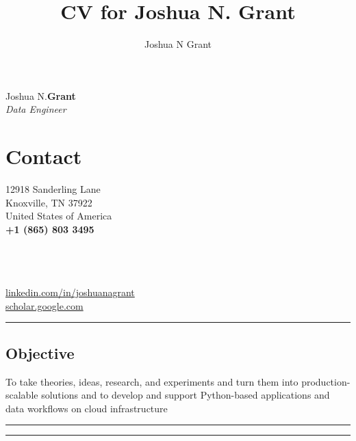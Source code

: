 \documentclass[10pt]{article}%
\author{Joshua N Grant}
\title{CV for Joshua N. Grant}
\begin{document}
\begin{minipage}[ht]{.33\linewidth}%
  \setlength{\headsep}{-10pt}%
  \setlength{\voffset}{-0.75in}%
  {\Large Joshua N.\huge\textbf{Grant}} \\
   \large \textit{Data Engineer}
\end{minipage}
\begin{minipage}[ht]{.25\linewidth}%
  \section*{\faUser{} Contact}%
  12918 Sanderling Lane \\
  Knoxville, TN 37922 \\
  United States of America \\
  \textbf{+1 (865) 803 3495} \faMobile{} \\
\end{minipage}
\begin{minipage}[ht]{.5\linewidth}%
  \href{mailto:jngrant@live.com}{\color{linkcolor}{jngrant@live.com \faEnvelope}} \\
  \href{https://notjustadatum.blogspot.com}{\color{linkcolor}{notjustadatum.blogspot.com \faBold}} \\
  \href{https://github.com/sempervent}{\color{linkcolor}{github.com/sempervent \faGithubAlt}} \\
  \href{https://www.linkedin.com/in/joshuanagrant}{\color{linkcolor} {\small linkedin.com/in/joshuanagrant} \faLinkedin} \\
  \href{https://scholar.google.com/citations?user=vs-HJQcAAAAJ&hl=en}{\color{linkcolor} {scholar.google.com \faPencil}}
\end{minipage}
\par\noindent\rule{\textwidth}{0.4pt}
\begin{center}
\section*{\faBullseye{} Objective}%
To take theories, ideas, research, and experiments and turn them into production-scalable solutions and to develop and support Python-based applications and data workflows on cloud infrastructure
\end{center}
\par\noindent\rule{\textwidth}{0.4pt}
\par\noindent\rule{\textwidth}{0.4pt}
\end{document}
